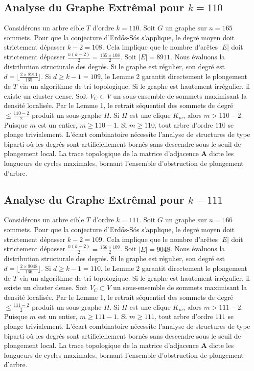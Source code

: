 \documentclass[11pt,a4paper]{article}
\begin{document}
\subsection{Analyse du Graphe Extr\^emal pour $k=110$}
Consid\'erons un arbre cible $T$ d'ordre $k=110$.
Soit $G$ un graphe sur $n=165$ sommets.
Pour que la conjecture d'Erd\H{o}s-S\'os s'applique, le degr\'e moyen doit strictement d\'epasser $k-2 = 108$.
Cela implique que le nombre d'ar\^etes $|E|$ doit strictement d\'epasser $\frac{n(k-2)}{2} = \frac{165 \times 108}{2}$.
Soit $|E| = 8911$.
Nous \'evaluons la distribution structurale des degr\'es. Si le graphe est r\'egulier, son degr\'e est $d = \lfloor \frac{2 \times 8911}{165} \rfloor$.
Si $d \geq k-1 = 109$, le Lemme 2 garantit directement le plongement de $T$ via un algorithme de tri topologique.
Si le graphe est hautement irr\'egulier, il existe un cluster dense. Soit $V_C \subset V$ un sous-ensemble de sommets maximisant la densit\'e localis\'ee.
Par le Lemme 1, le retrait s\'equentiel des sommets de degr\'e $\leq \frac{110-2}{2}$ produit un sous-graphe $H$.
Si $H$ est une clique $K_{m}$, alors $m > 110-2$. Puisque $m$ est un entier, $m \geq 110-1$. Si $m \geq 110$, tout arbre d'ordre $110$ se plonge trivialement.
L'\'ecart combinatoire n\'ecessite l'analyse de structures de type biparti o\`u les degr\'es sont artificiellement born\'es sans descendre sous le seuil de plongement local. La trace topologique de la matrice d'adjacence $\mathbf{A}$ dicte les longueurs de cycles maximales, bornant l'ensemble d'obstruction de plongement d'arbre.


\subsection{Analyse du Graphe Extr\^emal pour $k=111$}
Consid\'erons un arbre cible $T$ d'ordre $k=111$.
Soit $G$ un graphe sur $n=166$ sommets.
Pour que la conjecture d'Erd\H{o}s-S\'os s'applique, le degr\'e moyen doit strictement d\'epasser $k-2 = 109$.
Cela implique que le nombre d'ar\^etes $|E|$ doit strictement d\'epasser $\frac{n(k-2)}{2} = \frac{166 \times 109}{2}$.
Soit $|E| = 9048$.
Nous \'evaluons la distribution structurale des degr\'es. Si le graphe est r\'egulier, son degr\'e est $d = \lfloor \frac{2 \times 9048}{166} \rfloor$.
Si $d \geq k-1 = 110$, le Lemme 2 garantit directement le plongement de $T$ via un algorithme de tri topologique.
Si le graphe est hautement irr\'egulier, il existe un cluster dense. Soit $V_C \subset V$ un sous-ensemble de sommets maximisant la densit\'e localis\'ee.
Par le Lemme 1, le retrait s\'equentiel des sommets de degr\'e $\leq \frac{111-2}{2}$ produit un sous-graphe $H$.
Si $H$ est une clique $K_{m}$, alors $m > 111-2$. Puisque $m$ est un entier, $m \geq 111-1$. Si $m \geq 111$, tout arbre d'ordre $111$ se plonge trivialement.
L'\'ecart combinatoire n\'ecessite l'analyse de structures de type biparti o\`u les degr\'es sont artificiellement born\'es sans descendre sous le seuil de plongement local. La trace topologique de la matrice d'adjacence $\mathbf{A}$ dicte les longueurs de cycles maximales, bornant l'ensemble d'obstruction de plongement d'arbre.
\end{document}
